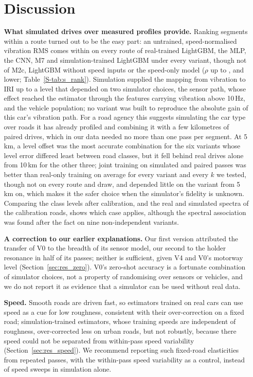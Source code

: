 \section{Discussion}
\label{sec:discussion}

\textbf{What simulated drives over measured profiles provide.}
Ranking segments within a route turned out to be the easy part: an untrained, speed-normalised vibration RMS comes within \rpAbsMax{} on every route of real-trained LightGBM, the MLP, the CNN, M7 and simulation-trained LightGBM under every variant, though not of M2c, LightGBM without speed inputs or the speed-only model ($\rho$ up to \rkIdxGapMax, \rkNoSpeedGapMax{} and \rkSpeedOnlyGapMax{} lower; Table~\ref{S-tab:s_rank}).
Simulation supplied the mapping from vibration to IRI up to a level that depended on two simulator choices, the sensor path, whose effect reached the estimator through the features carrying vibration above 10\,Hz, and the vehicle population; no variant was built to reproduce the absolute gain of this car's vibration path.
For a road agency this suggests simulating the car type over roads it has already profiled and combining it with a few kilometres of paired drives, which in our data needed no more than one pass per segment.
At 5\,km, a level offset was the most accurate combination for the six variants whose level error differed least between road classes, but it fell behind real drives alone from 10\,km for the other three; joint training on simulated and paired passes was better than real-only training on average for every variant and every $k$ we tested, though not on every route and draw, and depended little on the variant from 5\,km on, which makes it the safer choice when the simulator's fidelity is unknown.
Comparing the class levels after calibration, and the real and simulated spectra of the calibration roads, shows which case applies, although the spectral association was found after the fact on nine non-independent variants.

\textbf{A correction to our earlier explanations.}
Our first version attributed the transfer of V0 to the breadth of its sensor model, our second to the holder resonance in half of its passes; neither is sufficient, given V4 and V0's motorway level (Section~\ref{sec:res_zero}).
V0's zero-shot accuracy is a fortunate combination of simulator choices, not a property of randomising over sensors or vehicles, and we do not report it as evidence that a simulator can be used without real data.

\textbf{Speed.}
Smooth roads are driven fast, so estimators trained on real cars can use speed as a cue for low roughness, consistent with their over-correction on a fixed road; simulation-trained estimators, whose training speeds are independent of roughness, over-corrected less on urban roads, but not robustly, because there speed could not be separated from within-pass speed variability (Section~\ref{sec:res_speed}).
We recommend reporting such fixed-road elasticities from repeated passes, with the within-pass speed variability as a control, instead of speed sweeps in simulation alone.

